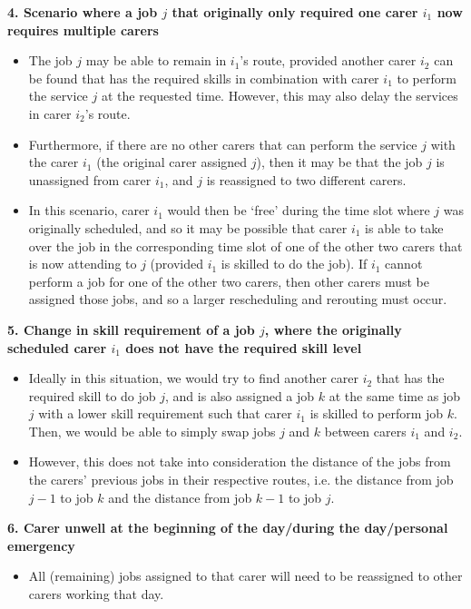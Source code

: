 \documentclass[a4paper]{article}
\begin{document}
\noindent \textbf{4. Scenario where a job $j$ that originally only required one carer $i_1$ now requires multiple carers}
\begin{itemize}[label=\textcolor{myGreen}{\textbullet},leftmargin=*, itemsep=-0.1em]
	\item The job $j$ may be able to remain in $i_1$'s route, provided another carer $i_2$ can be found that has the required skills in combination with carer $i_1$ to perform the service $j$ at the requested time. However, this may also delay the services in carer $i_2$'s route. 
	\item Furthermore, if there are no other carers that can perform the service $j$ with the carer $i_1$ (the original carer assigned $j$), then it may be that the job $j$ is unassigned from carer $i_1$, and $j$ is reassigned to two different carers. 
	\item In this scenario, carer $i_1$ would then be `free' during the time slot where $j$ was originally scheduled, and so it may be possible that carer $i_1$ is able to take over the job in the corresponding time slot of one of the other two carers that is now attending to $j$ (provided $i_1$ is skilled to do the job). If $i_1$ cannot perform a job for one of the other two carers, then other carers must be assigned those jobs, and so a larger rescheduling and rerouting must occur.
\end{itemize}

\noindent \textbf{5. Change in skill requirement of a job $j$, where the originally scheduled carer $i_1$ does not have the required skill level}
\begin{itemize}[label=\textcolor{myBlue}{\textbullet},leftmargin=*, itemsep=-0.1em]
	\item Ideally in this situation, we would try to find another carer $i_2$ that has the required skill to do job $j$, and is also assigned a job $k$ at the same time as job $j$ with a lower skill requirement such that carer $i_1$ is skilled to perform job $k$. Then, we would be able to simply swap jobs $j$ and $k$ between carers $i_1$ and $i_2$.
	\item However, this does not take into consideration the distance of the jobs from the carers' previous jobs in their respective routes, i.e. the distance from job $j-1$ to job $k$ and the distance from job $k-1$ to job $j$.
\end{itemize}

\noindent \textbf{6. Carer unwell at the beginning of the day/during the day/personal emergency}
\begin{itemize}[label=\textcolor{myPurple}{\textbullet},leftmargin=*, itemsep=-0.1em]
	\item All (remaining) jobs assigned to that carer will need to be reassigned to other carers working that day.
\end{itemize}
\end{document}
